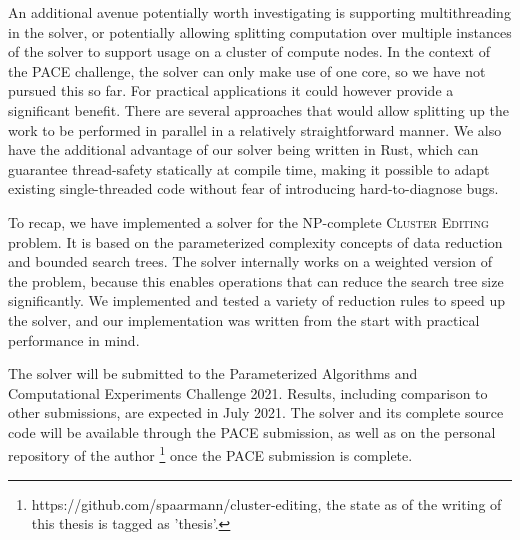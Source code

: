 \documentclass[12pt,oneside,english,parskip=full,headings=small]{scrbook}
\theoremstyle{definition}
\begin{document}
An additional avenue potentially worth investigating is supporting multithreading in the solver, or
potentially allowing splitting computation over multiple instances of the solver to support usage on
a cluster of compute nodes. In the context of the PACE challenge, the solver can only make use of
one core, so we have not pursued this so far. For practical applications it could however provide a
significant benefit. There are several approaches that would allow splitting up the work to be
performed in parallel in a relatively straightforward manner. We also have the additional advantage
of our solver being written in Rust, which can guarantee thread-safety statically at compile time,
making it possible to adapt existing single-threaded code without fear of introducing
hard-to-diagnose bugs.

To recap, we have implemented a solver for the NP-complete \textsc{Cluster Editing} problem. It is
based on the parameterized complexity concepts of data reduction and bounded search trees. The
solver internally works on a weighted version of the problem, because this enables operations that
can reduce the search tree size significantly. We implemented and tested a variety of reduction
rules to speed up the solver, and our implementation was written from the start with practical
performance in mind.

The solver will be submitted to the Parameterized Algorithms and Computational Experiments Challenge
2021. Results, including comparison to other submissions, are expected in July 2021. The solver and
its complete source code will be available through the PACE submission, as well as on the personal
repository of the author \footnote{https://github.com/spaarmann/cluster-editing, the state as of the
writing of this thesis is tagged as 'thesis'.} once the PACE submission is complete.
\end{document}
